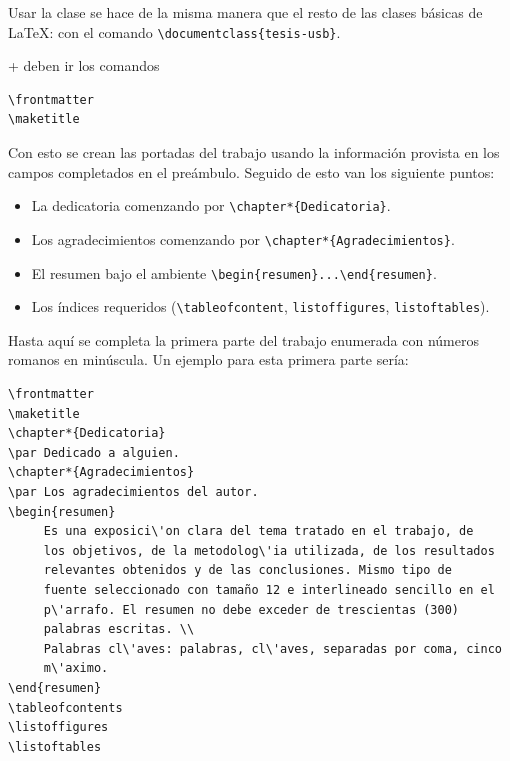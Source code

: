 \par Usar la clase se hace de la misma manera que el resto de las clases b\'asicas de \LaTeX: con el comando \verb+\documentclass{tesis-usb}+.
\begin{document}
+ deben ir los comandos 
\begin{verbatim}
\frontmatter
\maketitle
\end{verbatim}
Con esto se crean las portadas del trabajo usando la informaci\'on provista en los campos completados en el pre\'ambulo. Seguido de esto van los siguiente puntos:
\begin{itemize}
     \item La dedicatoria comenzando por \verb+\chapter*{Dedicatoria}+.
     \item Los agradecimientos comenzando por \verb+\chapter*{Agradecimientos}+.
     \item El resumen bajo el ambiente \verb+\begin{resumen}...\end{resumen}+.
     \item Los \'indices requeridos (\verb+\tableofcontent+, \verb+listoffigures+, \verb+listoftables+).
\end{itemize}
\par Hasta aqu\'i se completa la primera parte del trabajo enumerada con n\'umeros romanos en minúscula. Un ejemplo para esta primera parte ser\'ia:
\begin{verbatim}
\frontmatter
\maketitle
\chapter*{Dedicatoria}
\par Dedicado a alguien.
\chapter*{Agradecimientos}
\par Los agradecimientos del autor.
\begin{resumen}
     Es una exposici\'on clara del tema tratado en el trabajo, de 
     los objetivos, de la metodolog\'ia utilizada, de los resultados 
     relevantes obtenidos y de las conclusiones. Mismo tipo de 
     fuente seleccionado con tamaño 12 e interlineado sencillo en el 
     p\'arrafo. El resumen no debe exceder de trescientas (300) 
     palabras escritas. \\
     Palabras cl\'aves: palabras, cl\'aves, separadas por coma, cinco 
     m\'aximo.
\end{resumen}
\tableofcontents
\listoffigures
\listoftables
\end{verbatim}
\end{document}
